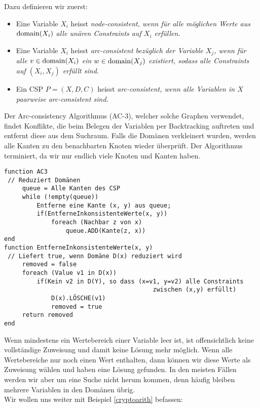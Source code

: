 Dazu definieren wir zuerst:

\begin{definition}
	\begin{itemize}
		\item Eine Variable $X_i$ heisst \em node-consistent\em, wenn für alle möglichen Werte aus $\operatorname{domain}(X_i)$ alle unären Constraints auf $X_i$ erfüllen.
		\item Eine Variable $X_i$ heisst \em arc-consistent bezüglich der Variable \em$X_j$, wenn für alle $v \in \operatorname{domain}(X_i)$ ein $w \in \operatorname{domain}(X_j)$ existiert, sodass alle Constraints auf $(X_i,X_j)$ erfüllt sind.
		\item Ein CSP $P=(X,D,C)$ heisst \em arc-consistent\em, wenn alle Variablen in $X$ paarweise arc-consistent sind.
	\end{itemize}
\end{definition}
Der Arc-consistency Algorithmus (AC-3), welcher solche Graphen verwendet, findet Konflikte, die beim Belegen der Variablen per Backtracking auftreten und entfernt diese aus dem Suchraum.
Falls die Domänen verkleinert wurden, werden alle Kanten zu den benachbarten Knoten wieder überprüft. Der Algorithmus terminiert, da wir nur endlich viele Knoten und Kanten haben.
\begin{verbatim}
function AC3
 // Reduziert Domänen
     queue = Alle Kanten des CSP
     while (!empty(queue))
         Entferne eine Kante (x, y) aus queue;
         if(EntferneInkonsistenteWerte(x, y))
             foreach (Nachbar z von x)
                 queue.ADD(Kante(z, x))
end
function EntferneInkonsistenteWerte(x, y)
 // Liefert true, wenn Domäne D(x) reduziert wird
     removed = false
     foreach (Value v1 in D(x))
         if(Kein v2 in D(Y), so dass (x=v1, y=v2) alle Constraints
                                         zwischen (x,y) erfüllt)
             D(x).LÖSCHE(v1)
             removed = true
     return removed
end
\end{verbatim}
Wenn mindestens ein Wertebereich einer Variable leer ist, ist
offensichtlich keine vollständige Zuweisung und damit keine
Lösung mehr möglich.
Wenn alle Wertebereiche nur noch einen Wert enthalten, dann
können wir diese Werte als Zuweisung wählen und haben eine
Lösung gefunden. In den meisten Fällen werden wir aber um eine Suche nicht herum kommen, denn häufig bleiben mehrere Variablen in den Domänen übrig. \\
Wir wollen uns weiter mit Beispiel \ref{cryptoarith} befassen:
